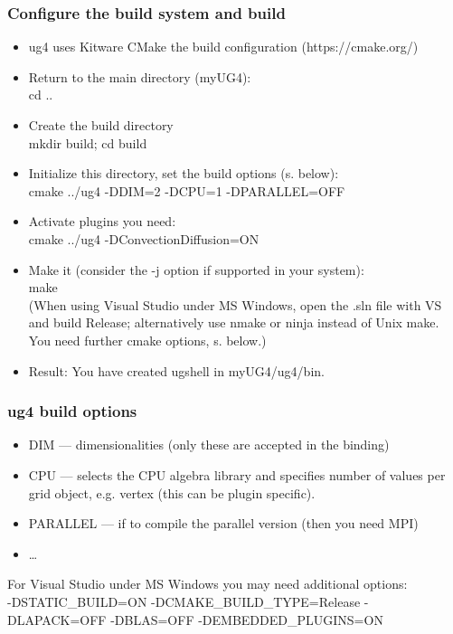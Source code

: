 \documentclass[xcolor=dvipsnames]{beamer}
\begin{document}
\begin {frame} [t]
\frametitle {Configure the build system and build}
\vspace {-2ex}
\begin {itemize}
	\item ug4 uses Kitware {\color{blue} CMake} the build configuration (https://cmake.org/)
	\pause
	\item Return to the main directory (myUG4): \\
		{\color{blue} cd ..}
	\pause
	\item Create the build directory \\
		{\color{blue} mkdir build; cd build}
	\pause
	\item Initialize this directory, set the build options (s. below): \\
		{\color{blue} cmake ../ug4 -DDIM=2 -DCPU=1 -DPARALLEL=OFF}
	\pause
	\item Activate plugins you need: \\
		{\color{blue} cmake ../ug4 -DConvectionDiffusion=ON}
	\pause
	\item Make it (consider the -j option if supported in your system): \\
		{\color{blue} make} \\
		{\tiny (When using Visual Studio under MS Windows, open the .sln file with VS and build Release;
		alternatively use nmake or ninja instead of Unix make. You need further cmake options,
		s. below.)}
	\pause
	\item Result: You have created ugshell in myUG4/ug4/bin.
\end {itemize}
\end {frame}

\begin {frame} [t]
\frametitle {ug4 build options}
\begin {itemize}
	\item {\color{blue} DIM} --- dimensionalities (only these are accepted in the binding)
	\pause
	\item {\color{blue} CPU} --- selects the CPU algebra library and specifies
 		number of values per grid object, e.g. vertex (this can be plugin specific).
	\pause
 	\item {\color{blue} PARALLEL} --- if to compile the parallel version (then you need MPI)
	\pause
 	\item \dots
\end {itemize}

\pause
\vspace {2ex}
{\tiny For Visual Studio under MS Windows you may need additional options: \\
{\color{blue}-DSTATIC\_BUILD=ON -DCMAKE\_BUILD\_TYPE=Release -DLAPACK=OFF -DBLAS=OFF -DEMBEDDED\_PLUGINS=ON}
}
\end {frame}
\end{document}
